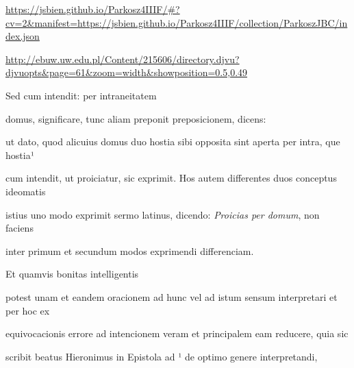 
\newParkoszpage

{
\url{https://jsbien.github.io/Parkosz4IIIF/\#?cv=2&manifest=https://jsbien.github.io/Parkosz4IIIF/collection/ParkoszJBC/index.json}

\url{http://ebuw.uw.edu.pl/Content/215606/directory.djvu?djvuopts&page=61&zoom=width&showposition=0.5,0.49}
}
\fullpreviouslines


{
\color{blue}

Sed cum intendit: per intraneitatem

domus, significare, tunc aliam preponit preposicionem, dicens: 

}



\fulllines{}
ut dato, quod alicuius domus duo hostia sibi opposita sint aperta per intra, que hostia¹

cum intendit, ut proiciatur, sic exprimit. Hos autem differentes duos conceptus ideomatis

istius uno modo exprimit sermo latinus, dicendo: \textit{Proicias per domum}, non faciens

\splitlines{}

inter primum et secundum modos exprimendi differenciam.

\indentK Et quamvis bonitas intelligentis 

\fulllines{}

potest unam et eandem oracionem ad hunc vel ad istum sensum interpretari et per hoc ex

equivocacionis errore ad intencionem veram et principalem eam reducere, quia sic

scribit beatus Hieronimus in Epistola ad ¹ de optimo genere interpretandi,

